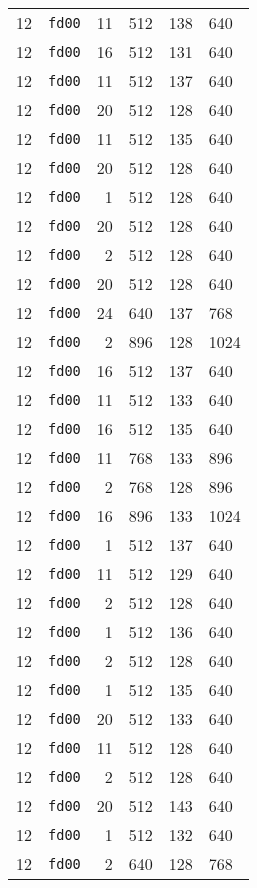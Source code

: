 \documentclass{article}
\begin{document}
\begin{table}[h!]
\begin{tabular}{llrrrl}
    12 & \texttt{fd00} & 11 & 512 & 138 & 640 \\
    12 & \texttt{fd00} & 16 & 512 & 131 & 640 \\
    12 & \texttt{fd00} & 11 & 512 & 137 & 640 \\
    12 & \texttt{fd00} & 20 & 512 & 128 & 640 \\
    12 & \texttt{fd00} & 11 & 512 & 135 & 640 \\
    12 & \texttt{fd00} & 20 & 512 & 128 & 640 \\
    12 & \texttt{fd00} & 1 & 512 & 128 & 640 \\
    12 & \texttt{fd00} & 20 & 512 & 128 & 640 \\
    12 & \texttt{fd00} & 2 & 512 & 128 & 640 \\
    12 & \texttt{fd00} & 20 & 512 & 128 & 640 \\
    12 & \texttt{fd00} & 24 & 640 & 137 & 768 \\
    12 & \texttt{fd00} & 2 & 896 & 128 & 1024 \\
    12 & \texttt{fd00} & 16 & 512 & 137 & 640 \\
    12 & \texttt{fd00} & 11 & 512 & 133 & 640 \\
    12 & \texttt{fd00} & 16 & 512 & 135 & 640 \\
    12 & \texttt{fd00} & 11 & 768 & 133 & 896 \\
    12 & \texttt{fd00} & 2 & 768 & 128 & 896 \\
    12 & \texttt{fd00} & 16 & 896 & 133 & 1024 \\
    12 & \texttt{fd00} & 1 & 512 & 137 & 640 \\
    12 & \texttt{fd00} & 11 & 512 & 129 & 640 \\
    12 & \texttt{fd00} & 2 & 512 & 128 & 640 \\
    12 & \texttt{fd00} & 1 & 512 & 136 & 640 \\
    12 & \texttt{fd00} & 2 & 512 & 128 & 640 \\
    12 & \texttt{fd00} & 1 & 512 & 135 & 640 \\
    12 & \texttt{fd00} & 20 & 512 & 133 & 640 \\
    12 & \texttt{fd00} & 11 & 512 & 128 & 640 \\
    12 & \texttt{fd00} & 2 & 512 & 128 & 640 \\
    12 & \texttt{fd00} & 20 & 512 & 143 & 640 \\
    12 & \texttt{fd00} & 1 & 512 & 132 & 640 \\
    12 & \texttt{fd00} & 2 & 640 & 128 & 768 \\

\end{tabular}
\end{table}
\end{document}
